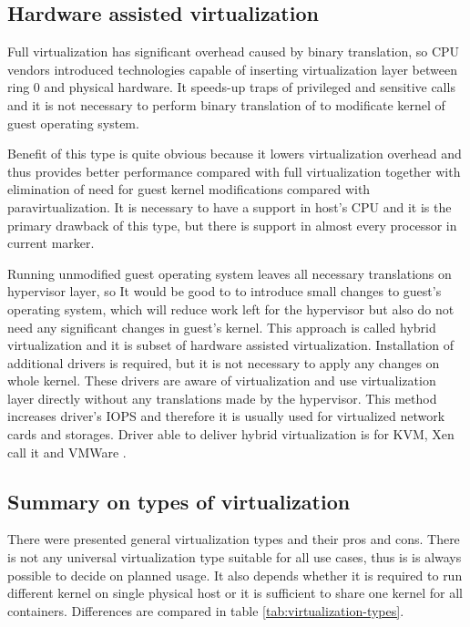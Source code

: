 \subsection{Hardware assisted virtualization}
Full virtualization has significant overhead caused by binary translation, so \Ac{CPU} vendors introduced technologies capable of inserting virtualization layer between ring 0 and physical hardware. It speeds-up traps of privileged and sensitive calls and it is not necessary to perform binary translation of to modificate kernel of guest operating system. 

Benefit of this type is quite obvious because it lowers virtualization overhead and thus provides better performance compared with full virtualization together with elimination of need for guest kernel modifications compared with paravirtualization. It is necessary to have a support in host's \Ac{CPU} and it is the primary drawback of this type, but there is support in almost every processor in current marker.

Running unmodified guest operating system leaves all necessary translations on hypervisor layer, so It would be good to to introduce small changes to guest's operating system, which will reduce work left for the hypervisor but also do not need any significant changes in guest's kernel. This approach is called hybrid virtualization and it is subset of hardware assisted virtualization. Installation of additional drivers is required, but it is not necessary to apply any changes on whole kernel. These drivers are aware of virtualization and use virtualization layer directly without any translations made by the hypervisor. This method increases driver's \Ac{IOPS} and therefore it is usually used for virtualized network cards and storages. Driver able to deliver hybrid virtualization is  for \Ac{KVM}, Xen call it  and VMWare  .

\subsection{Summary on types of virtualization}
There were presented general virtualization types and their pros and cons. There is not any universal virtualization type suitable for all use cases, thus is is always possible to decide on planned usage. It also depends whether it is required to run different kernel on single physical host or it is sufficient to share one kernel for all containers. Differences are compared in table \ref{tab:virtualization-types}.

